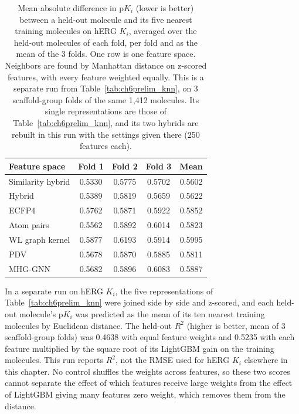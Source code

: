\begin{table}[htbp]
\centering
\small
\begin{tabular}{@{}lcccc@{}}
\toprule
Feature space & Fold 1 & Fold 2 & Fold 3 & Mean \\
\midrule
Similarity hybrid & 0.5330 & 0.5775 & 0.5702 & 0.5602 \\
Hybrid & 0.5389 & 0.5819 & 0.5659 & 0.5622 \\
ECFP4 & 0.5762 & 0.5871 & 0.5922 & 0.5852 \\
Atom pairs & 0.5562 & 0.5892 & 0.6014 & 0.5823 \\
WL graph kernel & 0.5877 & 0.6193 & 0.5914 & 0.5995 \\
PDV & 0.5678 & 0.5870 & 0.5885 & 0.5811 \\
MHG-GNN & 0.5682 & 0.5896 & 0.6083 & 0.5887 \\
\bottomrule
\end{tabular}
\caption[Activity difference to the nearest neighbors on hERG $K_i$]{Mean absolute difference in p$K_i$ (lower is better) between a held-out molecule and its five nearest training molecules on hERG $K_i$, averaged over the held-out molecules of each fold, per fold and as the mean of the 3 folds. One row is one feature space. Neighbors are found by Manhattan distance on z-scored features, with every feature weighted equally. This is a separate run from Table~\ref{tab:ch6prelim_knn}, on 3 scaffold-group folds of the same 1,412 molecules. Its single representations are those of Table~\ref{tab:ch6prelim_knn}, and its two hybrids are rebuilt in this run with the settings given there (250 features each).}
\label{tab:ch6prelim_neighbor_gap}
\end{table}

In a separate run on hERG $K_i$, the five representations of Table~\ref{tab:ch6prelim_knn} were joined side by side and z-scored, and each held-out molecule's p$K_i$ was predicted as the mean of its ten nearest training molecules by Euclidean distance. The held-out $R^2$ (higher is better, mean of 3 scaffold-group folds) was 0.4638 with equal feature weights and 0.5235 with each feature multiplied by the square root of its LightGBM gain on the training molecules. This run reports $R^2$, not the RMSE used for hERG $K_i$ elsewhere in this chapter. No control shuffles the weights across features, so these two scores cannot separate the effect of which features receive large weights from the effect of LightGBM giving many features zero weight, which removes them from the distance.


